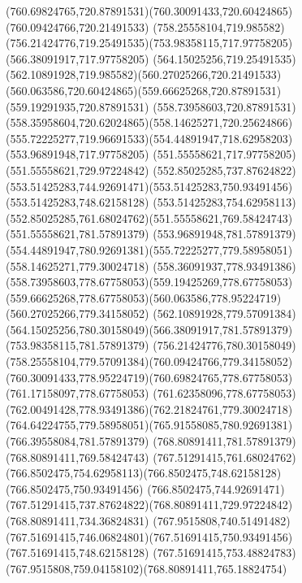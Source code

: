 {{\curveto(760.69824765,720.87891531)(760.30091433,720.60424865)(760.09424766,720.21491533)
\curveto(758.25558104,719.985582)(756.21424776,719.25491535)(753.98358115,717.97758205)
\lineto(566.38091917,717.97758205)
\curveto(564.15025256,719.25491535)(562.10891928,719.985582)(560.27025266,720.21491533)
\curveto(560.063586,720.60424865)(559.66625268,720.87891531)(559.19291935,720.87891531)
\curveto(558.73958603,720.87891531)(558.35958604,720.62024865)(558.14625271,720.25624866)
\curveto(555.72225277,719.96691533)(554.44891947,718.62958203)(553.96891948,717.97758205)
\lineto(551.55558621,717.97758205)
\lineto(551.55558621,729.97224842)
\curveto(552.85025285,737.87624822)(553.51425283,744.92691471)(553.51425283,750.93491456)
\lineto(553.51425283,748.62158128)
\curveto(553.51425283,754.62958113)(552.85025285,761.68024762)(551.55558621,769.58424743)
\lineto(551.55558621,781.57891379)
\lineto(553.96891948,781.57891379)
\curveto(554.44891947,780.92691381)(555.72225277,779.58958051)(558.14625271,779.30024718)
\curveto(558.36091937,778.93491386)(558.73958603,778.67758053)(559.19425269,778.67758053)
\curveto(559.66625268,778.67758053)(560.063586,778.95224719)(560.27025266,779.34158052)
\curveto(562.10891928,779.57091384)(564.15025256,780.30158049)(566.38091917,781.57891379)
\lineto(753.98358115,781.57891379)
\curveto(756.21424776,780.30158049)(758.25558104,779.57091384)(760.09424766,779.34158052)
\curveto(760.30091433,778.95224719)(760.69824765,778.67758053)(761.17158097,778.67758053)
\curveto(761.62358096,778.67758053)(762.00491428,778.93491386)(762.21824761,779.30024718)
\curveto(764.64224755,779.58958051)(765.91558085,780.92691381)(766.39558084,781.57891379)
\lineto(768.80891411,781.57891379)
\lineto(768.80891411,769.58424743)
\curveto(767.51291415,761.68024762)(766.8502475,754.62958113)(766.8502475,748.62158128)
\lineto(766.8502475,750.93491456)
\curveto(766.8502475,744.92691471)(767.51291415,737.87624822)(768.80891411,729.97224842)
\closepath
\moveto(768.80891411,734.36824831)
\curveto(767.9515808,740.51491482)(767.51691415,746.06824801)(767.51691415,750.93491456)
\lineto(767.51691415,748.62158128)
\curveto(767.51691415,753.48824783)(767.9515808,759.04158102)(768.80891411,765.18824754)
\closepath
}
}
{
}
